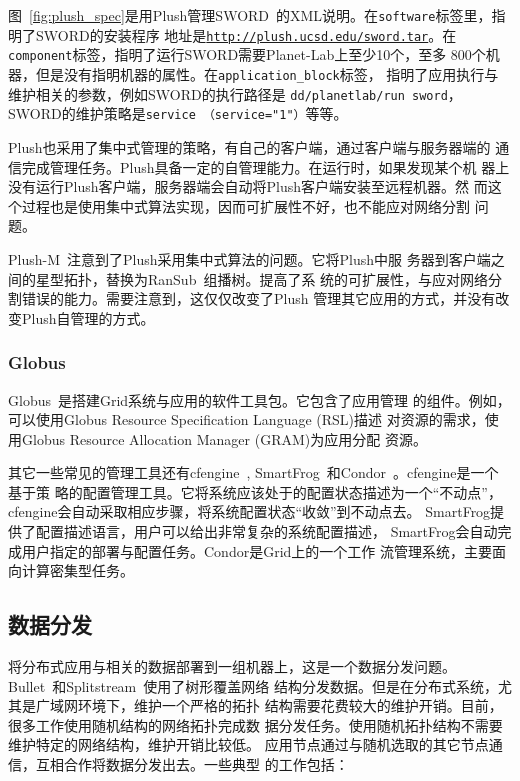 图~\ref{fig:plush_spec}是用Plush管理SWORD~\cite{sword_worlds,
sword_toit}的XML说明。在\texttt{software}标签里，指明了SWORD的安装程序
地址是\texttt{\url{http://plush.ucsd.edu/sword.tar}}。在
\texttt{component}标签，指明了运行SWORD需要Planet-Lab上至少10个，至多
800个机器，但是没有指明机器的属性。在\texttt{application\_block}标签，
指明了应用执行与维护相关的参数，例如SWORD的执行路径是
\texttt{dd\-/planetlab\-/run sword}，SWORD的维护策略是\texttt{service
（service="1"）}等等。

Plush也采用了集中式管理的策略，有自己的客户端，通过客户端与服务器端的
通信完成管理任务。Plush具备一定的自管理能力。在运行时，如果发现某个机
器上没有运行Plush客户端，服务器端会自动将Plush客户端安装至远程机器。然
而这个过程也是使用集中式算法实现，因而可扩展性不好，也不能应对网络分割
问题。

Plush-M~\cite{plush-m}注意到了Plush采用集中式算法的问题。它将Plush中服
务器到客户端之间的星型拓扑，替换为RanSub~\cite{ransub}组播树。提高了系
统的可扩展性，与应对网络分割错误的能力。需要注意到，这仅仅改变了Plush
管理其它应用的方式，并没有改变Plush自管理的方式。

\subsubsection*{Globus}

Globus~\cite{globus}是搭建Grid系统与应用的软件工具包。它包含了应用管理
的组件。例如，可以使用Globus Resource Specification Language (RSL)描述
对资源的需求，使用Globus Resource Allocation Manager (GRAM)为应用分配
资源。

其它一些常见的管理工具还有cfengine~\cite{cfengine},
SmartFrog~\cite{smartfrog}和Condor~\cite{condor}。cfengine是一个基于策
略的配置管理工具。它将系统应该处于的配置状态描述为一个“不动点”，
cfengine会自动采取相应步骤，将系统配置状态“收敛”到不动点去。
SmartFrog提供了配置描述语言，用户可以给出非常复杂的系统配置描述，
SmartFrog会自动完成用户指定的部署与配置任务。Condor是Grid上的一个工作
流管理系统，主要面向计算密集型任务。




\subsection{数据分发}
\label{sec:related:datadistro}

将分布式应用与相关的数据部署到一组机器上，这是一个数据分发问题。
Bullet~\cite{bullet}和Splitstream~\cite{splitstream}使用了树形覆盖网络
结构分发数据。但是在分布式系统，尤其是广域网环境下，维护一个严格的拓扑
结构需要花费较大的维护开销。目前，很多工作使用随机结构的网络拓扑完成数
据分发任务。使用随机拓扑结构不需要维护特定的网络结构，维护开销比较低。
应用节点通过与随机选取的其它节点通信，互相合作将数据分发出去。一些典型
的工作包括：

